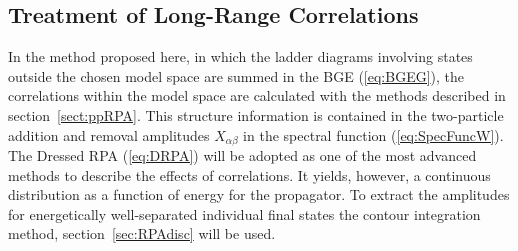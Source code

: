 \subsection{Treatment of Long-Range Correlations}
In the method proposed here, in which the ladder diagrams involving 
states outside the chosen model space are summed in the BGE (\ref{eq:BGEG}), 
the correlations within the model space are calculated with the methods 
described in section~\ref{sect:ppRPA}. This structure information is contained 
in the two-particle addition and removal amplitudes 
$X_{\alpha\beta}$ in the spectral function (\ref{eq:SpecFuncW}). 
The Dressed RPA (\ref{eq:DRPA}) will be adopted as one of the most 
advanced methods to describe the effects of correlations. It yields, 
however, a continuous distribution as a function of energy for the 
propagator. To 
extract the amplitudes for energetically well-separated individual final 
states the contour integration method, section~\ref{sec:RPAdisc} will be used.
